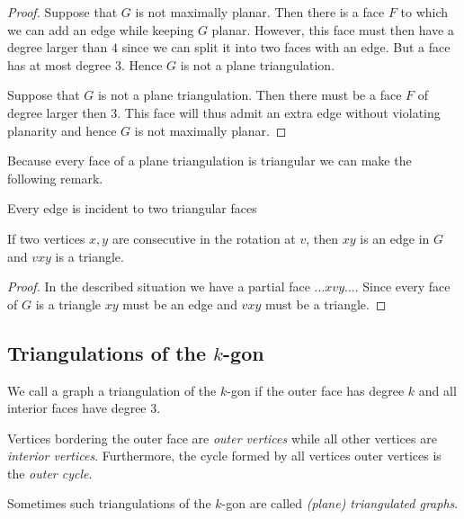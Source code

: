 \begin{proof}
Suppose that $G$ is not maximally planar. Then there is a face $F$ to which we can add an edge while keeping $G$ planar. However, this face must then have a degree larger than $4$ since we can split it into two faces with an edge. But a face has at most degree 3. Hence $G$ is not a plane triangulation.

Suppose that $G$ is not a plane triangulation. Then there must be a face $F$ of degree larger then $3$. This face will thus admit an extra edge without violating planarity and hence $G$ is not maximally planar.
\end{proof}

Because every face of a plane triangulation is triangular we can make the following remark.

\begin{remark}
  Every edge is incident to two triangular faces
\end{remark}

\begin{lemma}
  \label{lm:prelim:rotationEdge}
  If two vertices $x, y$ are consecutive in the rotation at $v$, then $xy$ is an edge in $G$ and $vxy$ is a triangle.
\end{lemma}
\begin{proof}
  In the described situation we have a partial face $\ldots x v y \ldots$.  Since every face of $G$ is a triangle $xy$ must be an edge and $vxy$ must be a triangle.
\end{proof}

\subsection{Triangulations of the $k$-gon}

\begin{defi}
We call a graph a triangulation of the $k$-gon if the outer face has degree $k$ and all interior faces have degree $3$.
\end{defi}
Vertices bordering the outer face are \emph{outer vertices} while all other vertices are \emph{interior vertices}. Furthermore, the cycle formed by all vertices outer vertices is the \emph{outer cycle}.

Sometimes such triangulations of the $k$-gon are called \emph{(plane) triangulated graphs}.
